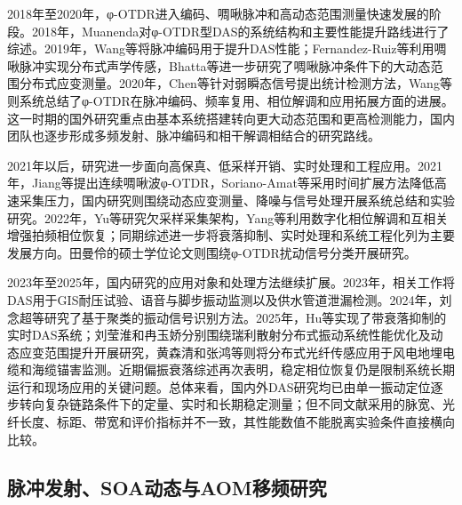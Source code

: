 2018年至2020年，φ-OTDR进入编码、啁啾脉冲和高动态范围测量快速发展的阶段。2018年，Muanenda对φ-OTDR型DAS的系统结构和主要性能提升路线进行了综述\cite{muanenda2018advances}。2019年，Wang等将脉冲编码用于提升DAS性能\cite{wang2019pulsecoding}；Fernandez-Ruiz等利用啁啾脉冲实现分布式声学传感\cite{fernandezruiz2019chirped}，Bhatta等进一步研究了啁啾脉冲条件下的大动态范围分布式应变测量\cite{bhatta2019dynamic}。2020年，Chen等针对弱瞬态信号提出统计检测方法\cite{chen2020transient}，Wang等则系统总结了φ-OTDR在脉冲编码、频率复用、相位解调和应用拓展方面的进展\cite{wang2020recent}。这一时期的国外研究重点由基本系统搭建转向更大动态范围和更高检测能力，国内团队也逐步形成多频发射、脉冲编码和相干解调相结合的研究路线。

2021年以后，研究进一步面向高保真、低采样开销、实时处理和工程应用。2021年，Jiang等提出连续啁啾波φ-OTDR\cite{jiang2021continuous}，Soriano-Amat等采用时间扩展方法降低高速采集压力\cite{sorianoamat2021time}，国内研究则围绕动态应变测量、降噪与信号处理开展系统总结和实验研究\cite{ma2021dynamic_cn,wu2021processing_cn,zhang2021phase_cn,rao2021recent,he2021review}。2022年，Yu等研究欠采样采集架构\cite{yu2022sampling}，Yang等利用数字化相位解调和互相关增强拍频相位恢复\cite{yang2022digitalized}；同期综述进一步将衰落抑制、实时处理和系统工程化列为主要发展方向\cite{liu2022advances,shang2022research,zhu2022linear}。田曼伶的硕士学位论文则围绕φ-OTDR扰动信号分类开展研究\cite{tian2022classification_thesis}。

2023年至2025年，国内研究的应用对象和处理方法继续扩展。2023年，相关工作将DAS用于GIS耐压试验、语音与脚步振动监测以及供水管道泄漏检测\cite{huang2023gis_cn,sun2023voice_cn,zhang2023pipeline_thesis}。2024年，刘念超等研究了基于聚类的振动信号识别方法\cite{liu2024clustering_cn}。2025年，Hu等实现了带衰落抑制的实时DAS系统\cite{hu2025realtime}；刘莹淮和冉玉娇分别围绕瑞利散射分布式振动系统性能优化及动态应变范围提升开展研究\cite{liu2025rayleigh_thesis,ran2025dynamic_thesis}，黄森清和张鸿等则将分布式光纤传感应用于风电地埋电缆和海缆锚害监测\cite{huang2025cable_thesis,zhang2025submarine_cn}。近期偏振衰落综述再次表明，稳定相位恢复仍是限制系统长期运行和现场应用的关键问题\cite{lei2025fading_cn}。总体来看，国内外DAS研究均已由单一振动定位逐步转向复杂链路条件下的定量、实时和长期稳定测量；但不同文献采用的脉宽、光纤长度、标距、带宽和评价指标并不一致，其性能数值不能脱离实验条件直接横向比较。

\subsection{脉冲发射、SOA动态与AOM移频研究}

